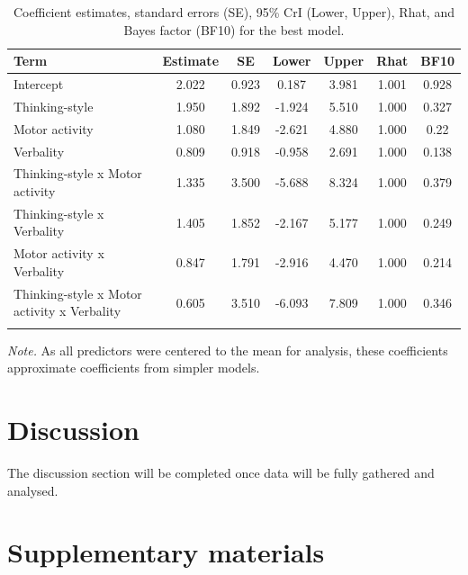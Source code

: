 \documentclass[a4paper,12pt,twoside,onecolumn,openright,final,oldfontcommands]{memoir}
\begin{document}
\begin{table}[H]
\begin{center}
\begin{threeparttable}
\caption{\label{tab:paramexp2panas}Coefficient estimates, standard errors (SE), 95\% CrI (Lower, Upper), Rhat, and Bayes factor (BF10) for the best model.}
\small{
\begin{tabular}{lcccccc}
\toprule
Term & \multicolumn{1}{c}{Estimate} & \multicolumn{1}{c}{SE} & \multicolumn{1}{c}{Lower} & \multicolumn{1}{c}{Upper} & \multicolumn{1}{c}{Rhat} & \multicolumn{1}{c}{BF10}\\
\midrule
Intercept & 2.022 & 0.923 & 0.187 & 3.981 & 1.001 & 0.928\\
Thinking-style & 1.950 & 1.892 & -1.924 & 5.510 & 1.000 & 0.327\\
Motor activity & 1.080 & 1.849 & -2.621 & 4.880 & 1.000 & 0.22\\
Verbality & 0.809 & 0.918 & -0.958 & 2.691 & 1.000 & 0.138\\
Thinking-style x Motor activity & 1.335 & 3.500 & -5.688 & 8.324 & 1.000 & 0.379\\
Thinking-style x Verbality & 1.405 & 1.852 & -2.167 & 5.177 & 1.000 & 0.249\\
Motor activity x Verbality & 0.847 & 1.791 & -2.916 & 4.470 & 1.000 & 0.214\\
Thinking-style x Motor activity x Verbality & 0.605 & 3.510 & -6.093 & 7.809 & 1.000 & 0.346\\
\bottomrule
\addlinespace
\end{tabular}
}
\begin{tablenotes}[para]
\textit{Note.} As all predictors were centered to the mean for analysis, these coefficients approximate coefficients from simpler models.
\end{tablenotes}
\end{threeparttable}
\end{center}
\end{table}

\hypertarget{discussion-4}{%
\section{Discussion}\label{discussion-4}}

The discussion section will be completed once data will be fully gathered and analysed.

\hypertarget{supp}{%
\section{Supplementary materials}\label{supp}}
\end{document}
